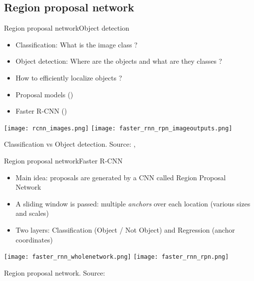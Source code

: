 \subsection{Region proposal network}

\begin{frame}{Region proposal network}{Object detection}

\begin{itemize}
    \item Classification: What is the image class ?
    \pause
    \item Object detection: Where are the objects and what are they classes ?
    \pause
    \item How to efficiently localize objects ?
    \item Proposal models (\citet{hosang2016what})
    \item Faster R-CNN (\citet{ren2015faster})
\end{itemize}
    \centering
    \texttt{[image: rcnn\_images.png]}
    \texttt{[image: faster\_rnn\_rpn\_imageoutputs.png]}\\
    \smallskip
    \centerline{\small Classification vs Object detection. Source: \citet{girshick2014rich},  \citet{ren2015faster}}

\end{frame}

\begin{frame}{Region proposal network}{Faster R-CNN}

\begin{itemize}
    \item Main idea: proposals are generated by a CNN called Region Proposal Network
    \pause
    \item A sliding window is passed: multiple \emph{anchors} over each location (various sizes and scales)
    \item Two layers: Classification (Object / Not Object) and Regression (anchor coordinates)
\end{itemize}
    
\renewcommand{\ratio}{0.45}
    \centering
    \texttt{[image: faster\_rnn\_wholenetwork.png]}
    \texttt{[image: faster\_rnn\_rpn.png]}\\
    \smallskip
    \centerline{\small Region proposal network. Source: \citet{ren2015faster}}

\end{frame}


